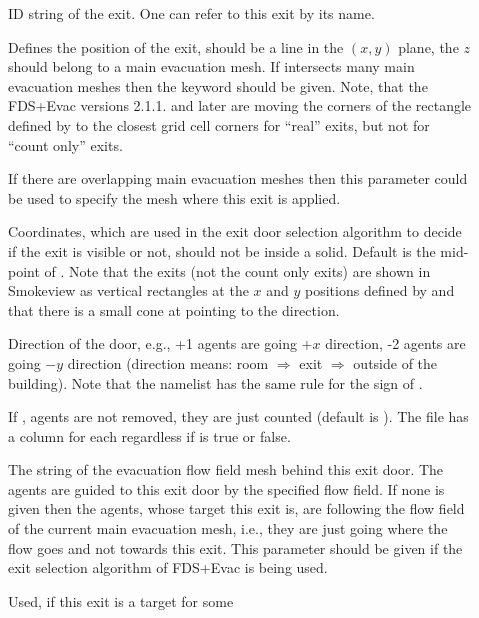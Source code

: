 \documentclass[12pt,a4paper,final,twoside]{stylevk}
\begin{document}
\begin{description}
%
\item[] ID string of the exit.  One can refer to this exit by
  its name.
%
\item[] Defines the position of the exit, should be a line
  in the $(x,y)$ plane, the $z$ should belong to a main evacuation
  mesh.  If  intersects many main evacuation meshes then the
  keyword  should be given.  Note, that the FDS+Evac
  versions 2.1.1. and later are moving the corners of the rectangle
  defined by  to the closest grid cell corners for ``real''
  exits, but not for ``count only'' exits.
%
\item[] If there are overlapping main evacuation
  meshes then this parameter could be used to specify the mesh where
  this exit is applied.
%
\item[] Coordinates, which are used in the exit door
  selection algorithm to decide if the exit is visible or not, should
  not be inside a solid.  Default is the mid-point of .
  Note that the exits (not the count only exits) are shown in
  Smokeview as vertical rectangles at the $x$ and $y$ positions
  defined by  and that there is a small cone at 
  pointing to the  direction.
%
\item[] Direction of the door, e.g., +1 agents are
  going $+x$ direction, -2 agents are going $-y$ direction (direction
  means: room $\Rightarrow$ exit $\Rightarrow$ outside of the
  building).  Note that the namelist  has the same rule
  for the sign of . 
%
\item[] If , agents are not removed,
  they are just counted (default is ).  The
   file has a column for each 
  regardless if  is true or false.
%
\item[] The  string of the evacuation
  flow field mesh behind this exit door.  The agents are guided to
  this exit door by the specified flow field.  If none is given then
  the agents, whose target this exit is, are following the flow field
  of the current main evacuation mesh, i.e., they are just
  going where the flow goes and not towards this exit.  This parameter
  should be given if the exit selection algorithm of FDS+Evac is being
  used.
%
\item[] Used, if this exit is a target for some

\end{description}
\end{document}

